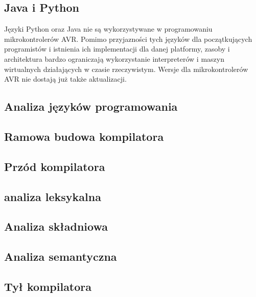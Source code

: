 \subsection{Java i Python}
Języki Python oraz Java nie są wykorzystywane w programowaniu mikrokontrolerów AVR. Pomimo przyjazności tych języków dla początkujących programistów i istnienia ich implementacji dla danej platformy, zasoby i architektura bardzo ograniczają wykorzystanie interpreterów i maszyn wirtualnych działających w czasie rzeczywistym. Wersje dla mikrokontrolerów AVR nie dostają już także aktualizacji.

\subsection{Analiza języków programowania}
\subsection{Ramowa budowa kompilatora}
\subsection{Przód kompilatora}
\subsection{analiza leksykalna}
\subsection{Analiza składniowa}
\subsection{Analiza semantyczna}

\subsection{Tył kompilatora}

%
%
%




